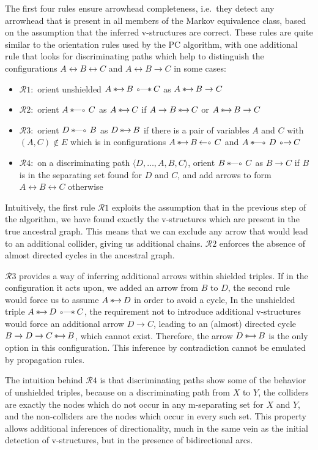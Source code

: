 The first four rules ensure arrowhead completeness, i.e.\ they detect any arrowhead that is present in all members of the Markov equivalence class, based on the assumption that the inferred v-structures are correct. These rules are quite similar to the orientation rules used by the PC algorithm, with one additional rule that looks for discriminating paths which help to distinguish the configurations $A \leftrightarrow B \leftrightarrow C$ and $A \leftrightarrow B \rightarrow C$ in some cases:
\begin{itemize}
 \item $\mathcal{R}1:$ orient unshielded $A \arrowSA B \arrowOS C$ as $A \arrowSA B \rightarrow C$
 \item $\mathcal{R}2:$ orient $A \arrowSO C$ as $A \arrowSA C$ if $A \rightarrow B \arrowSA C$ or $A \arrowSA B \rightarrow C$ 
 \item $\mathcal{R}3:$ orient $D \arrowSO B$ as $D \arrowSA B$ if there is a pair of variables $A$ and $C$ with $(A,C) \notin E$
 which is in configurations $A \arrowSA B \arrowAS C$ and $A \arrowSO D \arrowOA C$
 \item $\mathcal{R}4:$ on a discriminating path $\langle D, \dots, A,B,C \rangle$,
 orient $B \arrowSO C$ as $B \rightarrow C$ if $B$ is in the separating set found for $D$ and $C$,
 and add arrows to form $A \leftrightarrow B \leftrightarrow C$ otherwise
\end{itemize}
Intuitively, the first rule $\mathcal{R}1$ exploits the assumption that in the previous step of the algorithm, we have found exactly the v-structures which are present in the true ancestral graph. This means that we can exclude any arrow that would lead to an additional collider, giving us additional chains. $\mathcal{R}2$ enforces the absence of almost directed cycles in the ancestral graph.

$\mathcal{R}3$ provides a way of inferring additional arrows within shielded triples. If in the configuration it acts upon, we added an arrow from $B$ to $D$, the second rule would force us to assume $A \arrowSA D$ in order to avoid a cycle, In the unshielded triple $A \arrowSA D \arrowOS C$, the requirement not to introduce additional v-structures would force an additional arrow $D \rightarrow C$, leading to an (almost) directed cycle $B \rightarrow D \rightarrow C \arrowSA B$, which cannot exist. Therefore, the arrow $D \arrowSA B$ is the only option in this configuration. This inference by contradiction cannot be 
emulated by propagation rules.

The intuition behind $\mathcal{R}4$ is that discriminating paths show some of the behavior of unshielded triples, because on a discriminating path from $X$ to $Y$, the colliders are exactly the nodes which do not occur in any m-separating set for $X$ and $Y$, and the non-colliders are the nodes which occur in every such set. This property allows additional inferences of directionality, much in the same vein as the initial detection of v-structures, but in the presence of bidirectional arcs.

